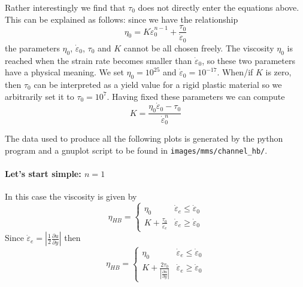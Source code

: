 Rather interestingly we find that $\tau_0$ does not directly enter the equations above.
This can be explained as follows: since we have the relationship 
\[
\eta_0 = K \dot{\varepsilon}_0^{n-1}  + \frac{\tau_0}{\dot{\varepsilon}_0}  
\]
the parameters $\eta_0$, $\dot{\varepsilon}_0$, $\tau_0$ and $K$ cannot be all chosen freely.
The viscosity $\eta_0$ is reached when the strain rate becomes smaller than $\dot{\varepsilon}_0$, 
so these two parameters have a physical meaning. We set $\eta_0=10^{25}$ and 
$\dot{\varepsilon}_0=10^{-17}$. When/if $K$ is zero, then $\tau_0$ can be interpreted as a 
yield value for a rigid plastic material so we arbitrarily set it to $\tau_0 = 10^7$. 
Having fixed these parameters we can compute 
\[
K= \frac{\eta_0 \dot{\varepsilon}_0 - \tau_0}{ \dot{\varepsilon}_0^n}
\] 

The data used to produce all the following plots is generated by the python program and a gnuplot script 
to be found in {\tt images/mms/channel\_hb/}.

\paragraph{Let's start simple: $n=1$}

In this case the viscosity is given by 
\[
\eta_{HB}
=
\left\{
\begin{array}{lc}
\eta_0 & \dot{\varepsilon}_e\leq \dot{\varepsilon}_0 \\
K+ \frac{\tau_0}{\dot{\varepsilon}_e}   & \dot{\varepsilon}_e\geq \dot{\varepsilon}_0 
\end{array}
\right.
\]
Since $\dot{\varepsilon}_e = \left|\frac{1}{2}\frac{\partial u}{\partial y} \right|$
then 
\[
\eta_{HB}
=
\left\{
\begin{array}{lc}
\eta_0 & \dot{\varepsilon}_e\leq \dot{\varepsilon}_0 \\
K+ \frac{2\tau_0}{  \left| \frac{\partial u}{\partial y} \right|  }   & \dot{\varepsilon}_e\geq \dot{\varepsilon}_0 
\end{array}
\right.
\]

